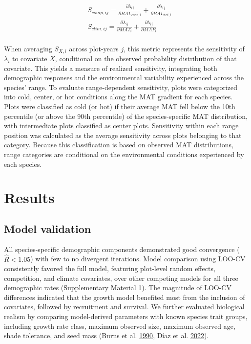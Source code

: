 \documentclass[12pt]{article}
\begin{document}
\begin{equation}
\begin{split}
&S_{comp, ij} = \frac{\partial \lambda_{ij}}{\partial BAL_{cons, i}} + \frac{\partial \lambda_{ij}}{\partial BAL_{het, i}} \\[2pt]
&S_{clim, ij} = \frac{\partial \lambda_{ij}}{\partial MAT_{i}} + \frac{\partial \lambda_{ij}}{\partial MAP_{i}} \\[2pt]
\end{split}
\label{eq:CCR}\end{equation}

When averaging \(S_{X,i}\) across plot-years \(j\), this metric
represents the sensitivity of \(\lambda_i\) to covariate \(X\),
conditional on the observed probability distribution of that covariate.
This yields a measure of realized sensitivity, integrating both
demographic responses and the environmental variability experienced
across the species' range. To evaluate range-dependent sensitivity,
plots were categorized into cold, center, or hot conditions along the
MAT gradient for each species. Plots were classified as cold (or hot) if
their average MAT fell below the 10th percentile (or above the 90th
percentile) of the species-specific MAT distribution, with intermediate
plots classified as center plots. Sensitivity within each range position
was calculated as the average sensitivity across plots belonging to that
category. Because this classification is based on observed MAT
distributions, range categories are conditional on the environmental
conditions experienced by each species.

\hypertarget{results}{%
\section{Results}\label{results}}

\hypertarget{model-validation}{%
\subsection{Model validation}\label{model-validation}}

All species-specific demographic components demonstrated good
convergence (\(\hat{R} < 1.05\)) with few to no divergent iterations.
Model comparison using LOO-CV consistently favored the full model,
featuring plot-level random effects, competition, and climate
covariates, over other competing models for all three demographic rates
(Supplementary Material 1). The magnitude of LOO-CV differences
indicated that the growth model benefited most from the inclusion of
covariates, followed by recruitment and survival. We further evaluated
biological realism by comparing model-derived parameters with known
species trait groups, including growth rate class, maximum observed
size, maximum observed age, shade tolerance, and seed mass (Burns et al.
\protect\hyperlink{ref-burns1990silvics}{1990}, Díaz et al.
\protect\hyperlink{ref-diaz2022}{2022}).
\end{document}
